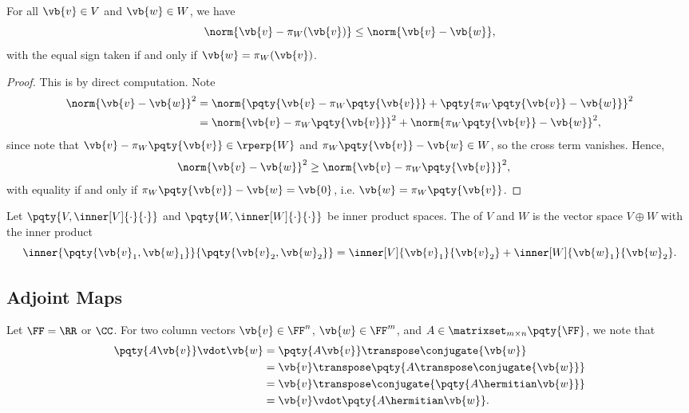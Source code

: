 \begin{proposition}
    For all \(\vb{v} \in V\) and \(\vb{w} \in W\), we have
    \[
        \norm{\vb{v} - \pi_W(\vb{v})} \leq \norm{\vb{v} - \vb{w}},
    \]
    with the equal sign taken if and only if \(\vb{w} = \pi_W(\vb{v})\).
\end{proposition}

\begin{proof}
    This is by direct computation. Note
    \begin{align*}
        \norm{\vb{v} - \vb{w}}^2 &= \norm{\pqty{\vb{v} - \pi_W\pqty{\vb{v}}} + \pqty{\pi_W\pqty{\vb{v}} - \vb{w}}}^2 \\
        &= \norm{\vb{v} - \pi_W\pqty{\vb{v}}}^2 + \norm{\pi_W\pqty{\vb{v}} - \vb{w}}^2,
    \end{align*}
    since note that \(\vb{v} - \pi_W\pqty{\vb{v}} \in \rperp{W}\) and \(\pi_W\pqty{\vb{v}} - \vb{w} \in W\), so the cross term vanishes. Hence,
    \begin{align*}
        \norm{\vb{v} - \vb{w}}^2 &\geq \norm{\vb{v} - \pi_W\pqty{\vb{v}}}^2,
    \end{align*}
    with equality if and only if \(\pi_W\pqty{\vb{v}} - \vb{w} = \vb{0}\), i.e. \(\vb{w} = \pi_W\pqty{\vb{v}}\).
\end{proof}

\begin{definition}
    Let \(\pqty{V, \inner[V]{\cdot}{\cdot}}\) and \(\pqty{W, \inner[W]{\cdot}{\cdot}}\) be inner product spaces. The  of \(V\) and \(W\) is the vector space \(V \oplus W\) with the inner product
    \[
        \inner{\pqty{\vb{v}_1, \vb{w}_1}}{\pqty{\vb{v}_2, \vb{w}_2}} = \inner[V]{\vb{v}_1}{\vb{v}_2} + \inner[W]{\vb{w}_1}{\vb{w}_2}.
    \]
\end{definition}

\subsection{Adjoint Maps}

\begin{example}
    Let \(\FF = \RR\) or \(\CC\). For two column vectors \(\vb{v} \in \FF^n\), \(\vb{w} \in \FF^m\), and \(A \in \matrixset_{m \times n} \pqty{\FF}\), we note that
    \begin{align*}
        \pqty{A \vb{v}} \vdot \vb{w} &= \pqty{A \vb{v}}\transpose \conjugate{\vb{w}} \\
        &= \vb{v}\transpose \pqty{A\transpose \conjugate{\vb{w}}} \\
        &= \vb{v}\transpose \conjugate{\pqty{A \hermitian \vb{w}}} \\
        &= \vb{v} \vdot \pqty{A\hermitian \vb{w}}.
    \end{align*}
\end{example}

